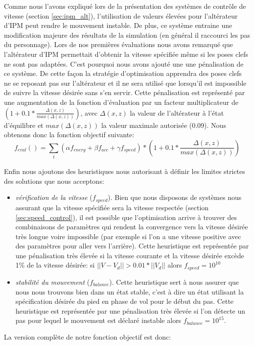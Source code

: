 \documentclass[runningheads,a4paper]{llncs}
\begin{document}
Comme nous l'avons expliqué lors de la présentation des systèmes de contrôle de vitesse (section \ref{sec:ipm_alt}), l'utilisation de valeurs élevées pour l'altérateur d'IPM peut rendre le mouvement instable. De plus, ce système entraine une modification majeure des résultats de la simulation (en général il raccourci les pas du personnage). Lors de nos premières évaluations nous avons remarqué que l'altérateur d'IPM permettait d'obtenir la vitesse spécifiée même si les poses clefs ne sont pas adaptées. C'est pourquoi nous avons ajouté une une pénalisation de ce système. De cette façon la stratégie d'optimisation apprendra des poses clefs ne se reposant pas sur l'altérateur et il ne sera utilisé que lorsqu'il est impossible de suivre la vitesse désirée sans s'en servir. Cette pénalisation est représenté par une augmentation de la fonction d'évaluation par un facteur multiplicateur de $(1+0.1*\frac{\Delta(x,z)}{max(\Delta(x,z))})$, avec $\Delta(x,z)$ la valeur de l'altérateur à l'état d'équilibre et $max(\Delta(x,z))$ la valeur maximale autorisée (0.09). Nous obtenons donc la fonction objectif suivante:
$$
f_{eval}() = \sum_{\substack{t}} (\alpha f_{energ} + \beta f_{acc} + \gamma f_{speed})*(1+0.1*\frac{\Delta(x,z)}{max(\Delta(x,z))}) 
$$

Enfin nous ajoutons des heuristiques nous autorisant à définir les limites strictes des solutions que nous acceptons:
\begin{itemize}
\item{\textit{vérification de la vitesse} ($f_{speed}$). Bien que nous disposons de systèmes nous assurant que la vitesse spécifiée sera la vitesse respectée (section \ref{sec:speed_control}), il est possible que l'optimisation arrive à trouver des combinaisons de paramètres qui rendent la convergence vers la vitesse désirée très longue voire impossible (par exemple si l'on a une vitesse positive avec des paramètres pour aller vers l'arrière). Cette heuristique est représentée par une pénalisation très élevée si la vitesse courante et la vitesse désirée excède 1\% de la vitesse désirée: si $||V-V_d||>0.01*||V_d||$ alors $f_{speed}=10^{10}$}
\item{\textit{stabilité du mouvement} ($f_{balance}$).  Cette heuristique sert à nous assurer que nous nous trouvons bien dans un état stable, c'est à dire un état utilisant la spécification désirée du pied en phase de vol pour le début du pas. Cette heuristique est représentée par une pénalisation très élevée si l'on détecte un pas pour lequel le mouvement est déclaré instable alors $f_{balance}=10^{15}$.  }
\end{itemize}
 La version complète de notre fonction objectif est donc:
\end{document}
